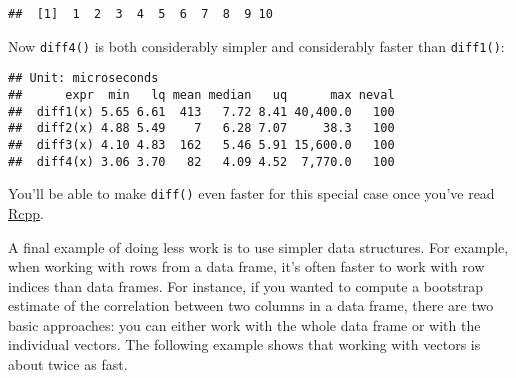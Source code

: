 \begin{verbatim}
##  [1]  1  2  3  4  5  6  7  8  9 10
\end{verbatim}

Now \texttt{diff4()} is both considerably simpler and considerably
faster than \texttt{diff1()}:

\begin{Shaded}
\begin{Highlighting}[]
\StringTok{ }\NormalTok{(}\NormalTok{)}
\NormalTok{(}
\NormalTok{)}
\end{Highlighting}
\end{Shaded}

\begin{verbatim}
## Unit: microseconds
##      expr  min   lq mean median   uq      max neval
##  diff1(x) 5.65 6.61  413   7.72 8.41 40,400.0   100
##  diff2(x) 4.88 5.49    7   6.28 7.07     38.3   100
##  diff3(x) 4.10 4.83  162   5.46 5.91 15,600.0   100
##  diff4(x) 3.06 3.70   82   4.09 4.52  7,770.0   100
\end{verbatim}

You'll be able to make \texttt{diff()} even faster for this special case
once you've read \protect\hyperlink{rcpp}{Rcpp}.

A final example of doing less work is to use simpler data structures.
For example, when working with rows from a data frame, it's often faster
to work with row indices than data frames. For instance, if you wanted
to compute a bootstrap estimate of the correlation between two columns
in a data frame, there are two basic approaches: you can either work
with the whole data frame or with the individual vectors. The following
example shows that working with vectors is about twice as fast.


